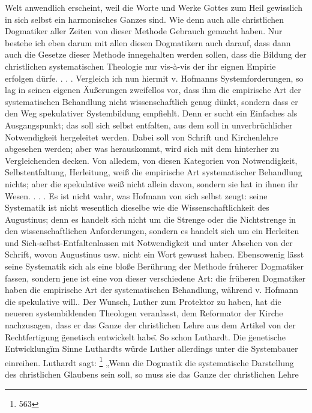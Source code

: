 Welt anwendlich erscheint, weil die Worte und Werke Gottes zum Heil gewisslich in sich selbst ein harmonisches Ganzes sind. Wie denn auch alle christlichen Dogmatiker aller Zeiten von dieser Methode Gebrauch gemacht haben. Nur bestehe ich eben darum mit allen diesen Dogmatikern auch darauf, dass dann auch die Gesetze dieser Methode innegehalten werden sollen, dass die Bildung der christlichen systematischen Theologie nur vis-à-vis der ihr eignen Empirie erfolgen dürfe. . . . Vergleich ich nun hiermit v. Hofmanns Systemforderungen, so lag in seinen eigenen Äußerungen zweifellos vor, dass ihm die empirische Art der systematischen Behandlung nicht wissenschaftlich genug dünkt, sondern dass er den Weg spekulativer Systembildung empfiehlt. Denn er sucht ein Einfaches als Ausgangspunkt; das soll sich selbst entfalten, aus dem soll in unverbrüchlicher Notwendigkeit hergeleitet werden. Dabei soll von Schrift und Kirchenlehre abgesehen werden; aber was herauskommt, wird sich mit dem hinterher zu Vergleichenden decken. Von alledem, von diesen Kategorien von Notwendigkeit, Selbstentfaltung, Herleitung, weiß die empirische Art systematischer Behandlung nichts; aber die spekulative weiß nicht allein davon, sondern sie hat in ihnen ihr Wesen. . . . Es ist nicht wahr, was Hofmann von sich selbst zeugt: seine Systematik ist nicht wesentlich dieselbe wie die Wissenschaftlichkeit des Augustinus; denn es handelt sich nicht um die Strenge oder die Nichtstrenge in den wissenschaftlichen Anforderungen, sondern es handelt sich um ein Herleiten und Sich-selbst-Entfaltenlassen mit Notwendigkeit und unter Absehen von der Schrift, wovon Augustinus usw. nicht ein Wort gewusst haben. Ebensowenig lässt seine Systematik sich als eine bloße Berührung der Methode früherer Dogmatiker fassen, sondern jene ist eine von dieser verschiedene Art: die früheren Dogmatiker haben die empirische Art der systematischen Behandlung, während v. Hofmann die spekulative will.\n{}. Der Wunsch, Luther zum Protektor zu haben, hat die neueren systembildenden Theologen veranlasst, dem Reformator der Kirche nachzusagen, dass er das Ganze der christlichen Lehre aus dem Artikel von der Rechtfertigung \"genetisch entwickelt habe\". So schon Luthardt. Die \"genetische Entwicklung\" im Sinne Luthardts würde Luther allerdings unter die Systembauer einreihen. Luthardt sagt: \footnote{563} „Wenn die Dogmatik die systematische Darstellung des christlichen Glaubens sein soll, so muss sie das Ganze der christlichen Lehre